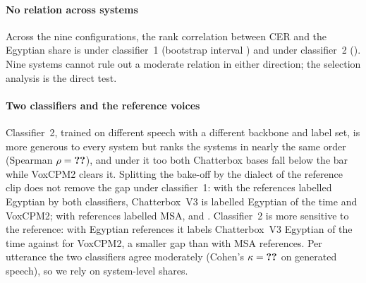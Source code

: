 \documentclass[11pt]{article}
\newcommand{\vox}{VoxCPM2\xspace}
\newcommand{\cbthree}{Chatterbox~V3\xspace}
\begin{document}
\paragraph{No relation across systems}
Across the nine configurations, the rank correlation between CER and the Egyptian share is  under
classifier~1 (bootstrap interval ) and  under classifier~2 (). Nine systems
cannot rule out a moderate relation in either direction; the selection analysis is the direct test.

\paragraph{Two classifiers and the reference voices}
Classifier~2, trained on different speech with a different backbone and label set, is more generous to every system but
ranks the systems in nearly the same order (Spearman $\rho=\R{rank:c1c2:rho}$), and under it too both Chatterbox bases
fall below the bar while \vox clears it. Splitting the bake-off by the dialect of the reference clip does not remove the
gap under classifier~1: with the references labelled Egyptian by both classifiers, \cbthree is labelled Egyptian
 of the time and \vox {}; with references labelled MSA,
 and . Classifier~2 is more sensitive to the reference: with Egyptian
references it labels \cbthree Egyptian  of the time against  for \vox, a smaller
gap than with MSA references. Per utterance the two classifiers agree moderately (Cohen's $\kappa=\R{kappa:gen}$ on
generated speech), so we rely on system-level shares.
\end{document}
